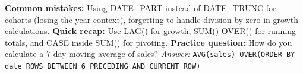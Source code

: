 \documentclass[12pt, a4paper]{article}
\begin{document}
\textbf{Common mistakes:} Using DATE\_PART instead of DATE\_TRUNC for cohorts (losing the year context), forgetting to handle division by zero in growth calculations.
\textbf{Quick recap:} Use LAG() for growth, SUM() OVER() for running totals, and CASE inside SUM() for pivoting.
\textbf{Practice question:} How do you calculate a 7-day moving average of sales?
\textit{Answer:} \texttt{AVG(sales) OVER(ORDER BY date ROWS BETWEEN 6 PRECEDING AND CURRENT ROW)}
\end{document}
